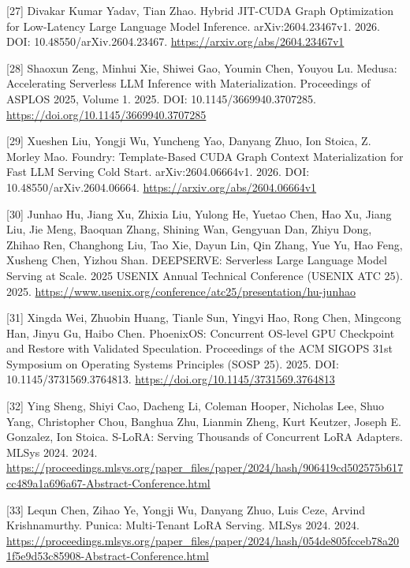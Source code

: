 \documentclass[UTF8,11pt,fontset=windows]{ctexart}
\begin{document}
\leavevmode{}%
{[}27{]} Divakar Kumar Yadav, Tian Zhao. Hybrid JIT-CUDA Graph Optimization for Low-Latency Large Language Model Inference. arXiv:2604.23467v1. 2026. DOI: 10.48550/arXiv.2604.23467. \url{https://arxiv.org/abs/2604.23467v1}

\leavevmode{}%
{[}28{]} Shaoxun Zeng, Minhui Xie, Shiwei Gao, Youmin Chen, Youyou Lu. Medusa: Accelerating Serverless LLM Inference with Materialization. Proceedings of ASPLOS 2025, Volume 1. 2025. DOI: 10.1145/3669940.3707285. \url{https://doi.org/10.1145/3669940.3707285}

\leavevmode{}%
{[}29{]} Xueshen Liu, Yongji Wu, Yuncheng Yao, Danyang Zhuo, Ion Stoica, Z. Morley Mao. Foundry: Template-Based CUDA Graph Context Materialization for Fast LLM Serving Cold Start. arXiv:2604.06664v1. 2026. DOI: 10.48550/arXiv.2604.06664. \url{https://arxiv.org/abs/2604.06664v1}

\leavevmode{}%
{[}30{]} Junhao Hu, Jiang Xu, Zhixia Liu, Yulong He, Yuetao Chen, Hao Xu, Jiang Liu, Jie Meng, Baoquan Zhang, Shining Wan, Gengyuan Dan, Zhiyu Dong, Zhihao Ren, Changhong Liu, Tao Xie, Dayun Lin, Qin Zhang, Yue Yu, Hao Feng, Xusheng Chen, Yizhou Shan. DEEPSERVE: Serverless Large Language Model Serving at Scale. 2025 USENIX Annual Technical Conference (USENIX ATC 25). 2025. \url{https://www.usenix.org/conference/atc25/presentation/hu-junhao}

\leavevmode{}%
{[}31{]} Xingda Wei, Zhuobin Huang, Tianle Sun, Yingyi Hao, Rong Chen, Mingcong Han, Jinyu Gu, Haibo Chen. PhoenixOS: Concurrent OS-level GPU Checkpoint and Restore with Validated Speculation. Proceedings of the ACM SIGOPS 31st Symposium on Operating Systems Principles (SOSP 25). 2025. DOI: 10.1145/3731569.3764813. \url{https://doi.org/10.1145/3731569.3764813}

\leavevmode{}%
{[}32{]} Ying Sheng, Shiyi Cao, Dacheng Li, Coleman Hooper, Nicholas Lee, Shuo Yang, Christopher Chou, Banghua Zhu, Lianmin Zheng, Kurt Keutzer, Joseph E. Gonzalez, Ion Stoica. S-LoRA: Serving Thousands of Concurrent LoRA Adapters. MLSys 2024. 2024. \url{https://proceedings.mlsys.org/paper_files/paper/2024/hash/906419cd502575b617cc489a1a696a67-Abstract-Conference.html}

\leavevmode{}%
{[}33{]} Lequn Chen, Zihao Ye, Yongji Wu, Danyang Zhuo, Luis Ceze, Arvind Krishnamurthy. Punica: Multi-Tenant LoRA Serving. MLSys 2024. 2024. \url{https://proceedings.mlsys.org/paper_files/paper/2024/hash/054de805fcceb78a201f5e9d53c85908-Abstract-Conference.html}
\end{document}

